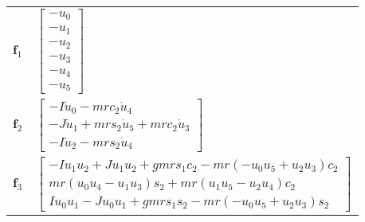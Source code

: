 \documentclass[smallcondensed]{svjour3}                     %
\begin{document}
\begin{table}[htbp]
\begin{tabular}[c]{r @{ $=$ } l}
    $\bm{f}_1$ & $\left[\begin{array}{c}-u_0 \\ -u_1 \\ -u_2 \\
             -u_3 \\ -u_4 \\ -u_5 \end{array}\right]$ \\
  $\bm{f}_2$ & $\left[\begin{array}{c}
-I \dot{u}_0 - m r c_2 \dot{u}_4 \\
-J \dot{u}_1 + m r s_2 \dot{u}_5 + m r c_2 \dot{u}_3 \\
-I \dot{u}_2 - m r s_2 \dot{u}_4
                   \end{array}\right]$ \\

  $\bm{f}_3$ & $\left[\begin{array}{c}
-I u_1 u_2 + J u_1 u_2 + g m r s_1 c_2 - m r (-u_0 u_5 + u_2 u_3) c_2 \\
                m r (u_0 u_4 - u_1 u_3) s_2 + m r (u_1 u_5 - u_2 u_4) c_2 \\
 I u_0 u_1 - J u_0 u_1 + g m r s_1 s_2 - m r (-u_0 u_5 + u_2 u_3) s_2
                   \end{array}\right]$
  \end{tabular}
\end{table}

\end{document}
